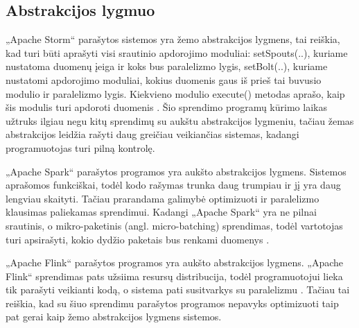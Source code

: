 \documentclass{VUMIFPSbakalaurinis}
\begin{document}
\subsection{Abstrakcijos lygmuo}

„Apache Storm“ parašytos sistemos yra žemo abstrakcijos lygmens, tai reiškia, kad turi būti aprašyti visi srautinio apdorojimo moduliai: 
setSpouts(..), kuriame nustatoma duomenų įeiga ir koks bus paralelizmo lygis, setBolt(..), kuriame nustatomi apdorojimo moduliai, kokius duomenis gaus iš prieš tai buvusio modulio ir paralelizmo lygis. Kiekvieno modulio execute() metodas aprašo, kaip šis modulis turi apdoroti duomenis \cite{tutpoint}. Šio sprendimo programų kūrimo laikas užtruks ilgiau negu kitų sprendimų su aukštu abstrakcijos lygmeniu, tačiau žemas abstrakcijos leidžia rašyti daug greičiau veikiančias sistemas, kadangi programuotojas turi pilną kontrolę. \par

„Apache Spark“ parašytos programos yra aukšto abstrakcijos lygmens. Sistemos aprašomos funkciškai, todėl kodo rašymas trunka daug trumpiau ir jį yra daug lengviau skaityti. Tačiau prarandama galimybė optimizuoti ir paralelizmo klausimas paliekamas sprendimui. Kadangi „Apache Spark“ yra ne pilnai srautinis, o mikro-paketinis (angl. micro-batching) sprendimas, todėl vartotojas turi apsirašyti, kokio dydžio paketais bus renkami duomenys \cite{shoro2015big}. \par

„Apache Flink“ parašytos programos yra aukšto abstrakcijos lygmens. „Apache Flink“ sprendimas pats užsiima resursų distribucija, todėl programuotojui lieka tik parašyti veikianti kodą, o sistema pati susitvarkys su paralelizmu \cite{flinkdoc}. Tačiau tai reiškia, kad su šiuo sprendimu parašytos programos nepavyks optimizuoti taip pat gerai kaip žemo abstrakcijos lygmens sistemos. \par
\end{document}
